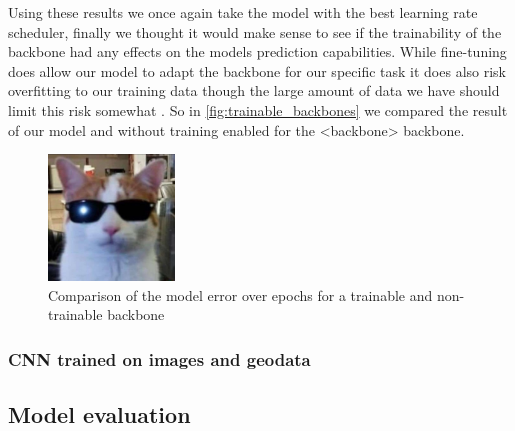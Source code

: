 \documentclass[12pt,a4paper,oneside]{article}
\begin{document}
Using these results we once again take the model with the best learning rate scheduler, finally we thought it would make sense to see if the trainability of the backbone had any effects on the models prediction capabilities. While fine-tuning does allow our model to adapt the backbone for our specific task it does also risk overfitting to our training data though the large amount of data we have should limit this risk somewhat \cite{Ying_2019}. So in \ref{fig:trainable_backbones} we compared the result of our model and without training enabled for the <backbone> backbone.

\begin{figure}[!h]
    \centering
    \includegraphics[width=0.3\textwidth]{assets/sample_image.jpeg}
    \caption{Comparison of the model error over epochs for a trainable and non-trainable backbone}
\end{figure}



\subsubsection{CNN trained on images and geodata}


\subsection{Model evaluation}



\end{document}
